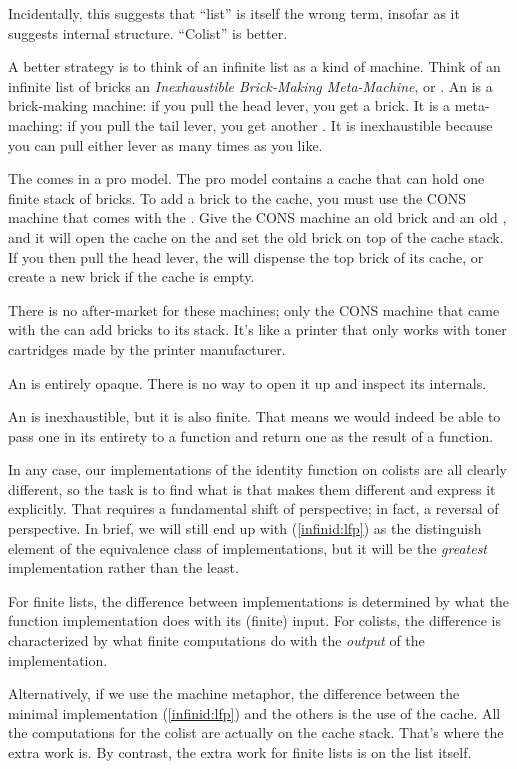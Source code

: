 Incidentally, this suggests that ``list'' is itself the wrong term,
insofar as it suggests internal structure. ``Colist'' is better.

A better strategy is to think of an infinite list as a kind of
machine. Think of an infinite list of bricks an \textit{Inexhaustible
  Brick-Making Meta-Machine}, or \IBMMM. An \IBMMM is a brick-making
machine: if you pull the \textsf{head} lever, you get a brick. It is a
meta-maching: if you pull the \textsf{tail} lever, you get another
\IBMMM. It is inexhaustible because you can pull either lever as many
times as you like.

The \IBMMM comes in a pro model. The pro model contains a cache that
can hold one finite stack of bricks. To add a brick to the cache, you
must use the \textsf{CONS} machine that comes with the \IBMMM. Give
the \textsf{CONS} machine an old brick and an old \IBMMM, and it will
open the cache on the \IBMMM and set the old brick on top of the cache
stack. If you then pull the \textsf{head} lever, the \IBMMM will
dispense the top brick of its cache, or create a new brick if the
cache is empty.

There is no after-market for these machines; only the \textsf{CONS}
machine that came with the \IBMMM can add bricks to its stack. It's
like a printer that only works with toner cartridges made by the
printer manufacturer.

An \IBMMM is entirely opaque. There is no way to open it up and
inspect its internals.

An \IBMMM is inexhaustible, but it is also finite. That means we would
indeed be able to pass one in its entirety to a function and return
one as the result of a function.

In any case, our implementations of the identity function on colists
are all clearly different, so the task is to find what is that makes
them different and express it explicitly. That requires a fundamental
shift of perspective; in fact, a reversal of perspective. In brief, we
will still end up with (\ref{infinid:lfp}) as the distinguish element
of the equivalence class of implementations, but it will be the
\textit{greatest} implementation rather than the least.

For finite lists, the difference between implementations is determined
by what the function implementation does with its (finite) input. For
colists, the difference is characterized by what finite
computations do with the \textit{output} of the implementation.

Alternatively, if we use the machine metaphor, the difference between
the minimal implementation (\ref{infinid:lfp}) and the others is the
use of the cache. All the computations for the colist are actually on
the cache stack. That's where the extra work is. By contrast, the
extra work for finite lists is on the list itself.

